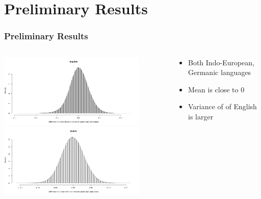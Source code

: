 \documentclass[handout]{beamer}
\begin{document}
\section{Preliminary Results}
\begin{frame}
    \frametitle{Preliminary Results}
    \begin{columns}[T]
        \begin{column}{6cm}
            \includegraphics[width=7cm]{images/en_hist.png}
            \includegraphics[width=7cm]{images/nl_hist.png}
        \end{column}
        \begin{column}{6cm}
            \begin{itemize}
                \item Both Indo-European, Germanic languages
                \pause
                \item Mean is close to 0
                \pause
                \item Variance of of English is larger
            \end{itemize}
        \end{column}
    \end{columns}
\end{frame}
\end{document}
